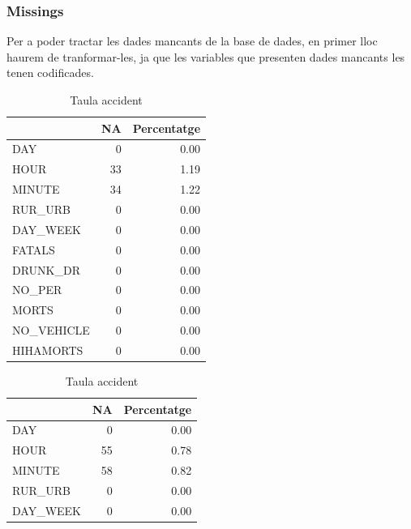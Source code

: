 \documentclass[11pt,longbibliography]{article}
\theoremstyle{definition}
\theoremstyle{remark}
\begin{document}
\subsubsection{Missings}

Per a poder tractar les dades mancants de la base de dades, en primer lloc haurem de tranformar-les, ja que les variables que presenten dades mancants les tenen codificades.

\begin{table}[H]
\parbox{.45\linewidth}{
\centering
\begin{tabular}{l|r|r|}
\cline{2-3}
\textbf{} & \multicolumn{1}{l|}{\textbf{NA}} & \multicolumn{1}{l|}{\textbf{Percentatge}} \\ \hline
\multicolumn{1}{|l|}{DAY}         & 0  & 0.00 \\ \hline
\multicolumn{1}{|l|}{HOUR}        & 33 & 1.19 \\ \hline
\multicolumn{1}{|l|}{MINUTE}      & 34 & 1.22 \\ \hline
\multicolumn{1}{|l|}{RUR\_URB}    & 0  & 0.00 \\ \hline
\multicolumn{1}{|l|}{DAY\_WEEK}   & 0  & 0.00 \\ \hline
\multicolumn{1}{|l|}{FATALS}      & 0  & 0.00 \\ \hline
\multicolumn{1}{|l|}{DRUNK\_DR}   & 0  & 0.00 \\ \hline
\multicolumn{1}{|l|}{NO\_PER}     & 0  & 0.00 \\ \hline
\multicolumn{1}{|l|}{MORTS}       & 0  & 0.00 \\ \hline
\multicolumn{1}{|l|}{NO\_VEHICLE} & 0  & 0.00 \\ \hline
\multicolumn{1}{|l|}{HIHAMORTS}   & 0  & 0.00 \\ \hline
\end{tabular}
\caption{Taula accident}
}
\hfill
\parbox{.45\linewidth}{
\centering
\begin{tabular}{l|r|r|}
\cline{2-3}
\textbf{} & \multicolumn{1}{l|}{\textbf{NA}} & \multicolumn{1}{l|}{\textbf{Percentatge}} \\ \hline
\multicolumn{1}{|l|}{DAY}         & 0   & 0.00 \\ \hline
\multicolumn{1}{|l|}{HOUR}        & 55  & 0.78 \\ \hline
\multicolumn{1}{|l|}{MINUTE}      & 58  & 0.82 \\ \hline
\multicolumn{1}{|l|}{RUR\_URB}    & 0   & 0.00 \\ \hline
\multicolumn{1}{|l|}{DAY\_WEEK}   & 0   & 0.00 \\ \hline

\end{tabular}}
\end{table}
\end{document}
